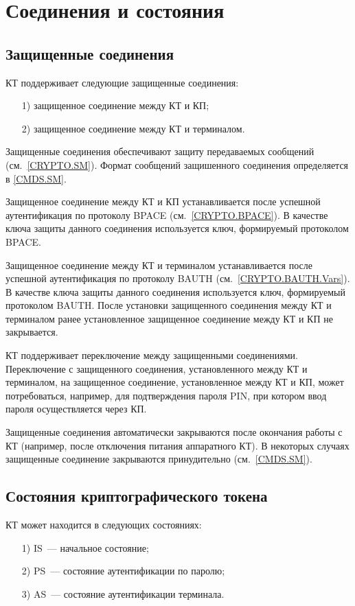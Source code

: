 \chapter{Соединения и состояния}
\label{STATES}

\section{Защищенные соединения}
\label{STATES.SM}

КТ поддерживает следующие защищенные соединения:
%
\begin{itemize}
\item[1)]
защищенное соединение между КТ и КП;
\item[2)]
защищенное соединение между КТ и терминалом.
\end{itemize}
%
Защищенные соединения обеспечивают защиту передаваемых сообщений
(см.~\ref{CRYPTO.SM}). Формат сообщений защишенного
соединения определяется в \ref{CMDS.SM}.

Защищенное соединение между КТ и КП устанавливается 
после успешной аутентификация по протоколу BPACE (см.~\ref{CRYPTO.BPACE}).
В качестве ключа защиты данного соединения используется 
ключ, формируемый протоколом BPACE.

Защищенное соединение между КТ и терминалом устанавливается 
после успешной аутентификация по протоколу BAUTH (см.~\ref{CRYPTO.BAUTH.Vars}).
В качестве ключа защиты данного соединения используется 
ключ, формируемый протоколом BAUTH.
После установки защищенного соединения между КТ и терминалом
ранее установленное защищенное соединение между КТ и КП
не закрывается. 

КТ поддерживает переключение между защищенными соединениями.
Переключение с защищенного соединения, установленного 
между КТ и терминалом, на защищенное соединение,
установленное между КТ и КП, 
может потребоваться, например,
для подтверждения пароля PIN, при котором ввод 
пароля осуществляется через КП. 

Защищенные соединения автоматически закрываются 
после окончания работы с КТ 
(например, после отключения питания аппаратного КТ).
В некоторых случаях защищенные соединение закрываются
принудительно (см.~\ref{CMDS.SM}).

\section{Состояния криптографического токена}
\label{STATES.ST}

КТ может находится в следующих состояниях:
%
\begin{itemize}
\item[1)]
IS~--- начальное состояние;
\item[2)]
PS~--- состояние аутентификации по паролю;
\item[3)]
AS~--- состояние аутентификации терминала.
\end{itemize}

